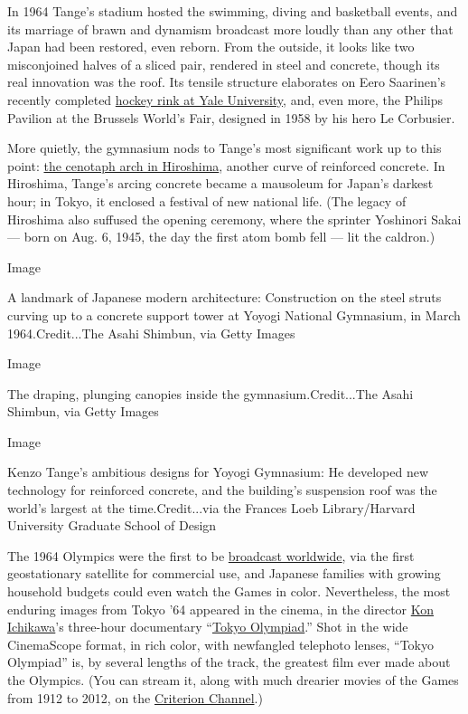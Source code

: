 In 1964 Tange's stadium hosted the swimming, diving and basketball
events, and its marriage of brawn and dynamism broadcast more loudly
than any other that Japan had been restored, even reborn. From the
outside, it looks like two misconjoined halves of a sliced pair,
rendered in steel and concrete, though its real innovation was the roof.
Its tensile structure elaborates on Eero Saarinen's recently completed
\href{https://sportsandrecreation.yale.edu/gallery/ingalls-rink-gallery}{hockey
rink at Yale University}, and, even more, the Philips Pavilion at the
Brussels World's Fair, designed in 1958 by his hero Le Corbusier.

More quietly, the gymnasium nods to Tange's most significant work up to
this point:
\href{https://www.nytimes.com/2016/05/28/world/asia/obama-hiroshima-japan.html}{the
cenotaph arch in Hiroshima}, another curve of reinforced concrete. In
Hiroshima, Tange's arcing concrete became a mausoleum for Japan's
darkest hour; in Tokyo, it enclosed a festival of new national life.
(The legacy of Hiroshima also suffused the opening ceremony, where the
sprinter Yoshinori Sakai --- born on Aug. 6, 1945, the day the first
atom bomb fell --- lit the caldron.)

Image

A landmark of Japanese modern architecture: Construction on the steel
struts curving up to a concrete support tower at Yoyogi National
Gymnasium, in March 1964.Credit...The Asahi Shimbun, via Getty Images

Image

The draping, plunging canopies inside the gymnasium.Credit...The Asahi
Shimbun, via Getty Images

Image

Kenzo Tange's ambitious designs for Yoyogi Gymnasium: He developed new
technology for reinforced concrete, and the building's suspension roof
was the world's largest at the time.Credit...via the Frances Loeb
Library/Harvard University Graduate School of Design

The 1964 Olympics were the first to be
\href{https://www.nytimes.com/1964/07/23/archives/tv-satellite-test-to-show-olympics-tokyo-games-to-be-seen-in-us.html}{broadcast
worldwide}, via the first geostationary satellite for commercial use,
and Japanese families with growing household budgets could even watch
the Games in color. Nevertheless, the most enduring images from Tokyo
'64 appeared in the cinema, in the director
\href{https://www.nytimes.com/1964/04/19/archives/shooting-an-oriental-olympiad.html}{Kon
Ichikawa}'s three-hour documentary
``\href{https://www.criterion.com/films/709-tokyo-olympiad}{Tokyo
Olympiad}.'' Shot in the wide CinemaScope format, in rich color, with
newfangled telephoto lenses, ``Tokyo Olympiad'' is, by several lengths
of the track, the greatest film ever made about the Olympics. (You can
stream it, along with much drearier movies of the Games from 1912 to
2012, on the
\href{https://www.criterionchannel.com/100-years-of-olympic-films-1912-2012}{Criterion
Channel}.)


